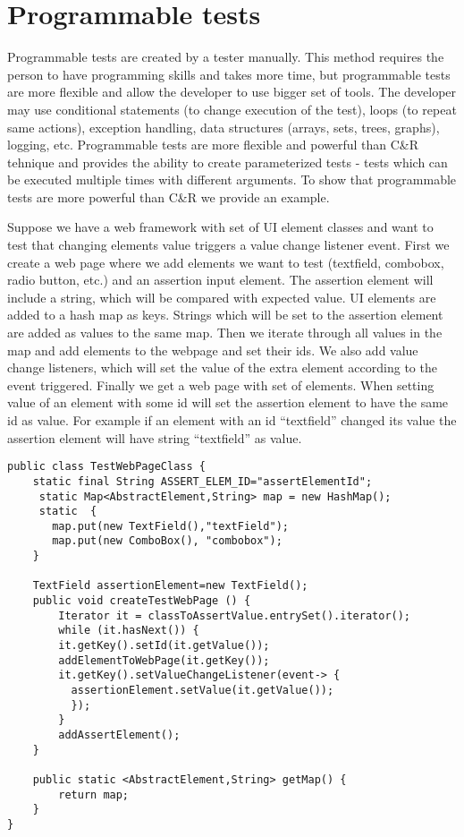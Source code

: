 		\section{Programmable tests} 
		\label{sec:programTests}
			Programmable tests are created by a tester manually. This method requires the
			person to have programming skills and takes more time, but programmable tests
			are more flexible and allow the developer to use bigger set of tools. The
			developer may use conditional statements (to change execution of the test),
			loops (to repeat same actions), exception handling, data structures (arrays,
			sets, trees, graphs), logging, etc. Programmable tests are more flexible and
			powerful than C\&R tehnique and provides the ability to create parameterized
			tests - tests which can be executed multiple times with different arguments.
			To show that programmable tests are more powerful than C\&R we provide an
			example.
			
			Suppose we have a web framework with set of UI element classes and want to
			test that changing elements value triggers a value change listener event.
			First we create a web page where we add elements we
			want to test (textfield, combobox, radio button, etc.) and an assertion input
			element. The assertion element will include a string, which will be
			compared with expected value.
			UI elements are added to a hash map as keys.
			Strings which will be set to the assertion element are added as values to the same map. Then we
			iterate through all values in the map and add elements to the webpage and set
			their ids. We also add value change listeners, which will set
			the value of the extra element according to the event triggered. Finally we
			get a web page with set of elements. When setting value of an element with
			some id will set the assertion element to have the same id as value. For
			example if an element with an id ``textfield'' changed its value the
			assertion element will have string ``textfield'' as value.
					
\begin{lstlisting}
public class TestWebPageClass {
	static final String ASSERT_ELEM_ID="assertElementId";
	 static Map<AbstractElement,String> map = new HashMap();
	 static  {
  	   map.put(new TextField(),"textField");
  	   map.put(new ComboBox(), "combobox");
	}

	TextField assertionElement=new TextField();
	public void createTestWebPage () {
	    Iterator it = classToAssertValue.entrySet().iterator();
	    while (it.hasNext()) {
	    it.getKey().setId(it.getValue());
	    addElementToWebPage(it.getKey());
	    it.getKey().setValueChangeListener(event-> {
	      assertionElement.setValue(it.getValue());
	      });
	  	}
		addAssertElement();
	}  
	
	public static <AbstractElement,String> getMap() {
		return map;
	}
}
\end{lstlisting}
      

